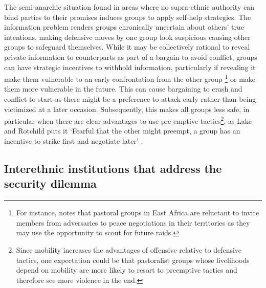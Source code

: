\documentclass[12pt]{article}
\begin{document}
The semi-anarchic situation found in areas where no supra-ethnic authority can
bind parties to their promises induces groups to apply self-help strategies. The
information problem renders groups chronically uncertain about others’ true
intentions, making defensive moves by one group look suspicious causing other
groups to safeguard themselves. While it may be collectively rational to reveal
private information to counterparts as part of a bargain to avoid conflict,
groups can have strategic incentives to withhold information, particularly if
revealing it make them vulnerable to an early confrontation from the other group
\footnote{For instance, \citet{Eaton_2008} notes that pastoral groups in East
	Africa are reluctant to invite members from adversaries to peace
negotiations in their territories as they may use the opportunity to scout for
future raids.} or make them more vulnerable in the future. This can cause
bargaining to crash and conflict to start as there might be a preference to
attack early rather than being victimized at a later occasion. Subsequently,
this makes all groups less safe, in particular when there are clear advantages
to use pre-emptive tactics\footnote{Since mobility increases the advantages of
	offensive relative to defensive tactics, one expectation could be that
	pastoralist groups whose livelihoods depend on mobility are more likely
	to resort to preemptive tactics and therefore see more violence in the
end.}, as Lake and Rotchild puts it ‘Fearful that the other might preempt, a
group has an incentive to strike first and negotiate later’
\citep[53]{Lake_1996}.

\subsection{Interethnic institutions that address the security dilemma}
\end{document}
